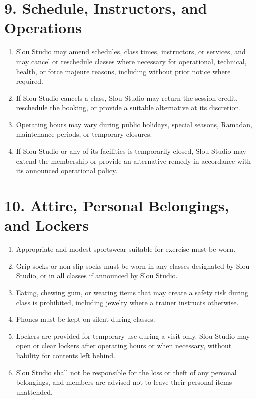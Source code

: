 \documentclass[12pt,a4paper]{article}
\begin{document}
\section*{9. Schedule, Instructors, and Operations}
\begin{enumerate}
    \item Slou Studio may amend schedules, class times, instructors, or services, and may cancel or reschedule classes where necessary for operational, technical, health, or force majeure reasons, including without prior notice where required.
    \item If Slou Studio cancels a class, Slou Studio may return the session credit, reschedule the booking, or provide a suitable alternative at its discretion.
    \item Operating hours may vary during public holidays, special seasons, Ramadan, maintenance periods, or temporary closures.
    \item If Slou Studio or any of its facilities is temporarily closed, Slou Studio may extend the membership or provide an alternative remedy in accordance with its announced operational policy.
\end{enumerate}

\section*{10. Attire, Personal Belongings, and Lockers}
\begin{enumerate}
    \item Appropriate and modest sportswear suitable for exercise must be worn.
    \item Grip socks or non-slip socks must be worn in any classes designated by Slou Studio, or in all classes if announced by Slou Studio.
    \item Eating, chewing gum, or wearing items that may create a safety risk during class is prohibited, including jewelry where a trainer instructs otherwise.
    \item Phones must be kept on silent during classes.
    \item Lockers are provided for temporary use during a visit only. Slou Studio may open or clear lockers after operating hours or when necessary, without liability for contents left behind.
    \item Slou Studio shall not be responsible for the loss or theft of any personal belongings, and members are advised not to leave their personal items unattended.
\end{enumerate}
\end{document}
